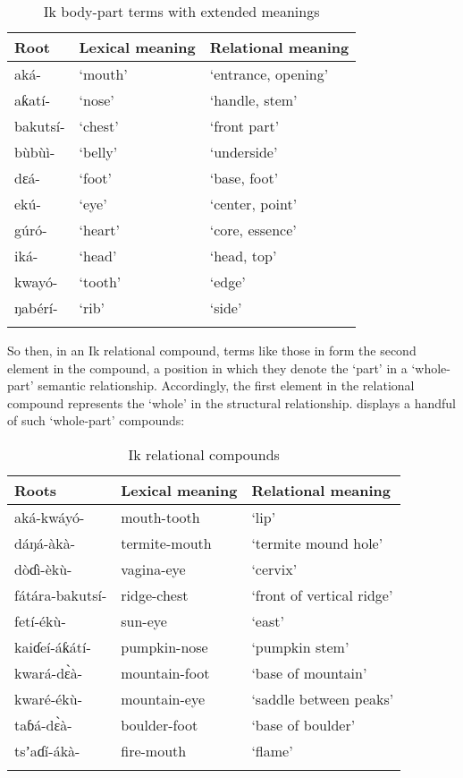 \begin{table}
\caption{Ik body-part terms with extended meanings}
\label{tab:nouns:rel1}


\begin{tabularx}{\textwidth}{XXX}
\lsptoprule

Root & Lexical meaning & Relational meaning\\
\midrule
aká- & ‘mouth’ & ‘entrance, opening’\\
aƙatí- & ‘nose’ & ‘handle, stem’\\
bakutsí- & ‘chest’ & ‘front part’\\
bùbùì- & ‘belly’ & ‘underside’\\
dɛá- & ‘foot’ & ‘base, foot’\\
ekú- & ‘eye’ & ‘center, point’\\
gúró- & ‘heart’ & ‘core, essence’\\
iká- & ‘head’ & ‘head, top’\\
kwayó- & ‘tooth’ & ‘edge’\\
ŋabérí- & ‘rib’ & ‘side’\\
\lspbottomrule
\end{tabularx}
\end{table}
So then, in an Ik relational compound, terms like those in  form the second element in the compound, a position in which they denote the ‘part’ in a ‘whole-part’ semantic relationship. Accordingly, the first element in the relational compound represents the ‘whole’ in the structural relationship.  displays a handful of such ‘whole-part’ compounds:


\begin{table}
\caption{Ik relational compounds}
\label{tab:nouns:rel2}


\begin{tabularx}{\textwidth}{XXX}
\lsptoprule

Roots & Lexical meaning & Relational meaning\\
\midrule
aká-kwáyó- & mouth-tooth & ‘lip’\\
dáŋá-àkà- & termite-mouth & ‘termite mound hole’\\
dòɗì-èkù- & vagina-eye & ‘cervix’\\
fátára-bakutsí- & ridge-chest & ‘front of vertical ridge’\\
fetí-ékù- & sun-eye & ‘east’\\
kaiɗeí-áƙátí- & pumpkin-nose & ‘pumpkin stem’\\
kwará-d\`{ɛ}à- & mountain-foot & ‘base of mountain’\\
kwaré-ékù- & mountain-eye & ‘saddle between peaks’\\
taɓá-d\`{ɛ}à- & boulder-foot & ‘base of boulder’\\
tsʼaɗí-ákà- & fire-mouth & ‘flame’\\
\lspbottomrule
\end{tabularx}
\end{table}

